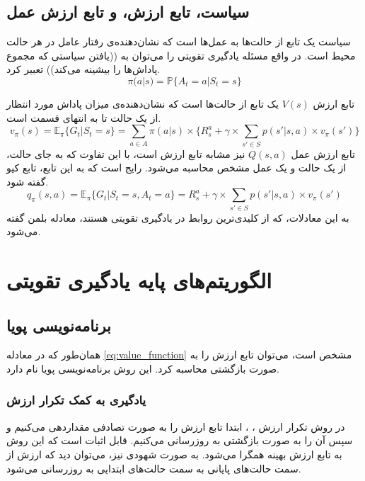 \subsection{سیاست، تابع ارزش، و تابع ارزش عمل}
سیاست 
یک تابع از حالت‌ها به عمل‌ها است که نشان‌دهنده‌ی رفتار عامل در هر حالت محیط است.
در واقع مسئله یادگیری تقویتی را می‌توان به ((یافتن سیاستی که مجموع پاداش‌ها را بیشینه می‌کند)) تعبیر کرد.
\begin{equation}\label{eq:policy}
    \pi(a|s) = \mathbb{P}\{A_t = a | S_t = s\}
\end{equation}

تابع ارزش  $V(s)$
یک تابع از حالت‌ها است که نشان‌دهنده‌ی میزان پاداش مورد انتظار از یک حالت تا به انتهای قسمت است.
\begin{equation}\label{eq:value_function}
    v_\pi(s) = \mathbb{E}_\pi\{G_t | S_t = s\} = \sum_{a \in A}\pi(a|s)\times\{R_s^a + \gamma \times \sum_{s' \in S}p(s'|s,a)\times v_\pi(s')\}
\end{equation}
تابع ارزش عمل  $Q(s, a)$
نیز مشابه تابع ارزش است، با این تفاوت که به جای حالت، از یک حالت و یک عمل مشخص محاسبه می‌شود. رایج است که به این تابع، تابع کیو گفته شود.
\begin{equation}\label{eq:q_function}
    q_\pi(s,a) = \mathbb{E}_\pi\{G_t | S_t = s, A_t = a\} = R_s^a + \gamma \times \sum_{s' \in S}p(s'|s,a)\times v_\pi(s')
\end{equation}
به این معادلات، که از کلیدی‌ترین روابط در یادگیری تقویتی هستند، معادله بلمن  گفته می‌شود.
\section{الگوریتم‌های پایه یادگیری تقویتی}
\subsection{برنامه‌نویسی پویا}
همان‌طور که در معادله \ref{eq:value_function} مشخص است، می‌توان تابع ارزش را به صورت بازگشتی محاسبه کرد.
این روش برنامه‌نویسی پویا 
نام دارد.
\subsubsection{یادگیری به کمک تکرار ارزش}
در روش تکرار ارزش ،
، ابتدا تابع ارزش را به صورت تصادفی مقداردهی می‌کنیم و سپس آن را به صورت بازگشتی به روزرسانی می‌کنیم.
قابل اثبات است که این روش به تابع ارزش بهینه همگرا می‌شود.
به صورت شهودی نیز، می‌توان دید که ارزش از سمت حالت‌های پایانی به سمت حالت‌های ابتدایی به روزرسانی می‌شود.
